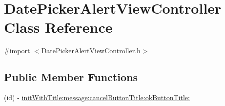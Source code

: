 \hypertarget{interface_date_picker_alert_view_controller}{
\section{DatePickerAlertViewController Class Reference}
\label{interface_date_picker_alert_view_controller}
}


{\ttfamily \#import $<$DatePickerAlertViewController.h$>$}

\subsection*{Public Member Functions}
\begin{DoxyCompactItemize}
\item 
(id) -\/ \hyperlink{interface_date_picker_alert_view_controller_aeeef1e43f0acbef356e2612b730ceea3}{initWithTitle:message:cancelButtonTitle:okButtonTitle:}
\end{DoxyCompactItemize}
